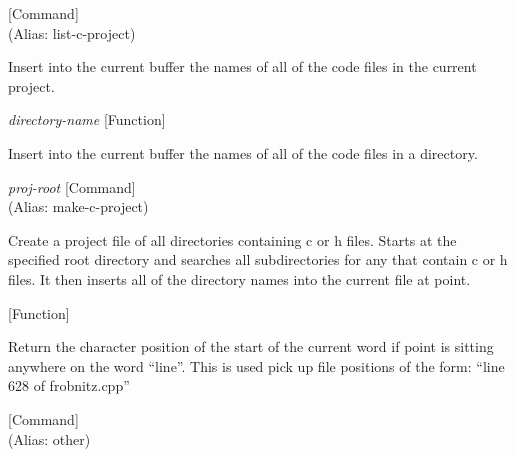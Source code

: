 \vspace{1em}
\noindent
{}
\usebox{\funcname}
 \hfill [Command]\\%
 (Alias: list-c-project)

\begin{doc-string}
Insert into the current buffer the names of all of the code files in the
current project.
\end{doc-string}

\vspace{1em}
\noindent
{}
\usebox{\funcname}\emph{directory-name}
 \hfill [Function]

\begin{doc-string}
Insert into the current buffer the names of all of the code files in a directory.
\end{doc-string}

\vspace{1em}
\noindent
{}
\usebox{\funcname}\emph{proj-root}
 \hfill [Command]\\%
 (Alias: make-c-project)

\begin{doc-string}
Create a project file of all directories containing c or h files.
Starts at the specified root directory and searches all subdirectories for
any that contain c or h files.  It then inserts all of the directory names
into the current file at point.
\end{doc-string}

\vspace{1em}
\noindent
{}
\usebox{\funcname}
 \hfill [Function]

\begin{doc-string}
Return the character position of the start of the current word if point is sitting
anywhere on the word ``line''.  This is used pick up file positions of the form:
``line 628 of frobnitz.cpp''
\end{doc-string}

\vspace{1em}
\noindent
{}
\usebox{\funcname}
 \hfill [Command]\\%
 (Alias: other)

